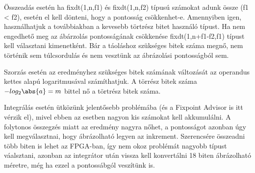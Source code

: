 Összeadás esetén ha fixdt(1,n,f1) és fixdt(1,n,f2) típusú számokat adunk össze (f1 < f2), esetén el kell dönteni, hogy a pontosság csökkenhet-e. Amennyiben igen, használhatjuk a továbbiakban a kevesebb törtrész bitet használó típust. Ha nem engedhető meg az ábárzolás pontosságának csökkenése fixdt(1,n+f1-f2,f1) típust kell választani kimenetként. Bár a táoláshoz szükséges bitek száma megnő, nem történik sem túlcsordulás és nem vesztünk az ábrázolási pontosságból sem.

Szorzás esetén az eredményhez szükséges bitek számának változását az operandus kettes alapú logaritmusával számíthatjuk. A törrész bitek száma $-log_2\abs{a} = m$ bittel nő a törtrész bitek száma.

Integrálás esetén ütközünk jelentősebb problémába (és a Fixpoint Advisor is itt vérzik el), mivel ebben az esetben nagyon kis számokat kell akkumulálni. A folytonos összegzés miatt az eredmény nagyra nőhet, a pontosságot azonban úgy kell megválasztnai, hogy ábrázolható legyen az inkrement. Szerencsére összeadni több biten is lehet az FPGA-ban, így nem okoz problémát nagyobb típust váalsztani, azonban az integrátor után vissza kell konvertálni 18 biten ábrázolható méretre, még ha ezzel a pontossábgól veszítünk is.
